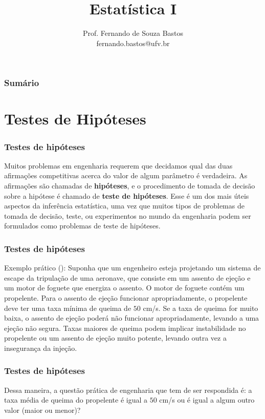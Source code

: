 \documentclass[14pt,aspectratio=1610]{beamer}
\title{Estatística I}
\author{Prof. Fernando de Souza Bastos\texorpdfstring{\\ fernando.bastos@ufv.br}{}}
\institute{Departamento de Estatística\texorpdfstring{\\ Universidade Federal de Viçosa}{}\texorpdfstring{\\ Campus UFV - Viçosa}{}}
\date{}
\begin{document}


\frame{\titlepage}

\begin{frame}{}
\frametitle{\bf Sumário}
\tableofcontents
\end{frame}

\section{Testes de Hipóteses}
\begin{frame}{}
\frametitle{Testes de hipóteses}
\begin{block}{}
\nocite{Apostila}
\justifying
Muitos problemas em engenharia requerem que decidamos qual das duas afirmações competitivas acerca do valor de algum parâmetro é verdadeira. As afirmações 
são chamadas de \textbf{hipóteses}, e o procedimento de tomada de decisão sobre a hipótese é chamado de \textbf{teste de hipóteses}. Esse é um dos mais úteis 
aspectos da inferência estatística, uma vez que muitos tipos de problemas de tomada de decisão, teste, ou experimentos no mundo da engenharia podem ser formulados 
como problemas de teste de hipóteses.
\end{block}
\end{frame}

\begin{frame}{}
\frametitle{Testes de hipóteses}
\begin{block}{Exemplo prático (\cite{montgomery2016}):}
\justifying
Suponha que um engenheiro esteja projetando um sistema de escape da tripulação de uma aeronave, que consiste em um assento de ejeção e um motor de foguete 
que energiza o assento. O motor de foguete contém um propelente. Para o assento de ejeção funcionar apropriadamente, o propelente deve ter uma taxa mínima de 
queima de $50$ cm/s. Se a taxa de queima for muito baixa, o assento de ejeção poderá não funcionar apropriadamente, levando a uma ejeção não segura. Taxas maiores 
de queima podem implicar instabilidade no propelente ou um assento de ejeção muito potente, levando outra vez a insegurança da injeção. 
\end{block}
\end{frame}

\begin{frame}{}
	\frametitle{Testes de hipóteses}
	\begin{block}{}
		\justifying
		Dessa maneira, a questão 
		prática de engenharia que tem de ser respondida é: a taxa média de queima do propelente é igual a $50$ cm/s ou é igual a algum outro valor 
		(maior ou menor)?
	\end{block}
\end{frame}
\end{document}
